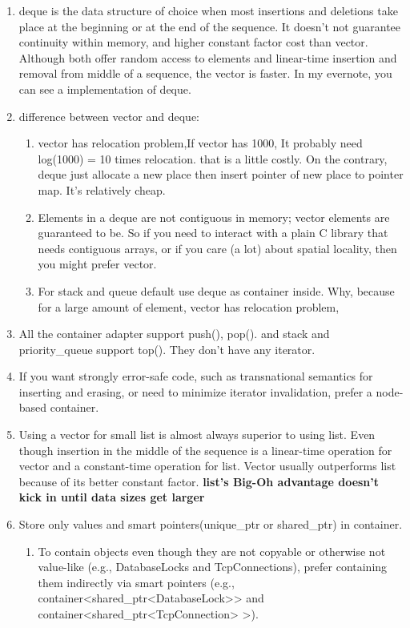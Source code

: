 \documentclass[a4paper,11pt,twoside]{book}
\begin{document}
\begin{itemize}
\begin{enumerate}
\item deque is the data structure of choice when most insertions and deletions take place at the beginning or at the end of the sequence. It doesn't not guarantee continuity within memory, and higher constant factor cost than vector. Although both offer random access to elements and linear-time insertion and removal from middle of a sequence, the vector is faster.  In my evernote, you can see a implementation of deque.

\item difference between vector and deque:
\begin{enumerate}
\item vector has relocation problem,If vector has 1000, It probably need log(1000) = 10 times relocation. that is a little costly. On the contrary, deque just allocate a new place then insert pointer of new place to pointer map. It's relatively cheap.


\item Elements in a deque are not contiguous in memory; vector elements are guaranteed to be. So if you need to interact with a plain C library that needs contiguous arrays, or if you care (a lot) about spatial locality, then you might prefer vector.

\item For stack and queue default use deque as container inside. Why, because for a large amount of element, vector has relocation problem,
\end{enumerate}


\item All the container adapter support push(), pop(). and stack and priority\_queue support top(). They don't have any iterator.

\item If you want strongly error-safe code, such as transnational semantics for inserting and erasing, or need to minimize iterator invalidation, prefer a node-based container.

\item Using a vector for small list is almost always superior to using list. Even though insertion in the middle of the sequence is a linear-time operation for vector and a constant-time operation for list. Vector usually outperforms list because of its better constant factor. \textbf{list's Big-Oh advantage doesn't kick in until data sizes get larger}

\item Store only values and smart pointers(unique\_ptr or shared\_ptr) in container.
\begin{enumerate}
\item To contain objects even though they are
not copyable or otherwise not value-like (e.g., DatabaseLocks and
TcpConnections), prefer containing them indirectly via smart pointers (e.g.,
container<shared\_ptr<DatabaseLock>> and \\
container<shared\_ptr<TcpConnection> >).


\end{enumerate}
\end{enumerate}
\end{itemize}
\end{document}
